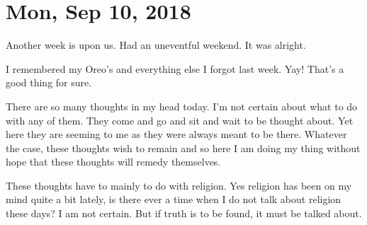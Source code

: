 \section{Mon, Sep 10, 2018}

Another week is upon us. Had an uneventful weekend. It was alright.

I remembered my Oreo's and everything else I forgot last week. Yay! That's a good
thing for sure.

There are so many thoughts in my head today. I'm not certain about what to do with
any of them. They come and go and sit and wait to be thought about. Yet here they are
seeming to me as they were always meant to be there. Whatever the case, these
thoughts wish to remain and so here I am doing my thing without hope that these
thoughts will remedy themselves.

These thoughts have to mainly to do with religion. Yes religion has been on my mind
quite a bit lately, is there ever a time when I do not talk about religion these
days? I am not certain. But if truth is to be found, it must be talked about.
